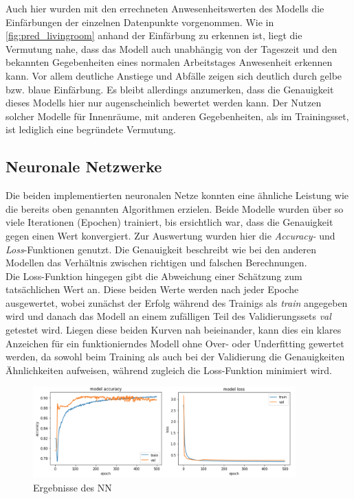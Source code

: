 Auch hier wurden mit den errechneten Anwesenheitswerten des Modells die Einfärbungen der einzelnen Datenpunkte 
vorgenommen. 
Wie in \ref{fig:pred_livingroom} anhand der Einfärbung zu erkennen ist, liegt die Vermutung nahe, dass das Modell 
auch unabhängig von der Tageszeit und den bekannten Gegebenheiten eines normalen Arbeitstages Anwesenheit 
erkennen kann. Vor allem deutliche Anstiege und Abfälle zeigen sich deutlich durch gelbe bzw. blaue Einfärbung.
Es bleibt allerdings anzumerken, dass die Genauigkeit dieses Modells hier nur augenscheinlich bewertet werden kann.
Der Nutzen solcher Modelle für Innenräume, mit anderen Gegebenheiten, als im Trainingsset, ist lediglich eine 
begründete Vermutung. 
\newpage

\subsection{Neuronale Netzwerke}
Die beiden implementierten neuronalen Netze konnten eine ähnliche Leistung wie die bereits oben genannten 
Algorithmen erzielen. Beide Modelle wurden über so viele Iterationen (Epochen) trainiert, bis ersichtlich war,
dass die Genauigkeit gegen einen Wert konvergiert. Zur Auswertung wurden hier die \textit{Accuracy-} und 
\textit{Loss}-Funktionen genutzt. Die Genauigkeit beschreibt wie bei den anderen Modellen das Verhältnis
zwischen richtigen und falschen Berechnungen.\\
Die Loss-Funktion hingegen gibt die Abweichung einer Schätzung zum tatsächlichen Wert an. Diese beiden Werte 
werden nach jeder Epoche ausgewertet, wobei zunächst der Erfolg während des Trainigs als \textit{train}
angegeben wird und danach das Modell an einem zufälligen Teil des Validierungssets \textit{val} getestet wird.
Liegen diese beiden Kurven nah beieinander, kann dies ein klares Anzeichen für ein funktionierndes Modell ohne 
Over- oder Underfitting gewertet werden, da sowohl beim Training als auch bei der Validierung die Genauigkeiten 
Ähnlichkeiten aufweisen, während zugleich die Loss-Funktion minimiert wird.

\begin{figure}[h]
    \centering
    \includegraphics[width=0.9\textwidth]{pic/eval_NN.png}
    \caption{Ergebnisse des NN}
    \label{fig:eval_NN}
\end{figure}

